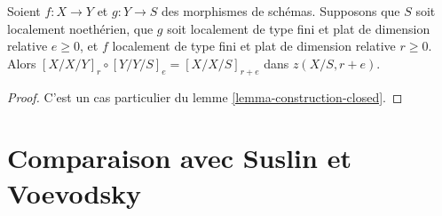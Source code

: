 \begin{lemma} 
\label{lemma-composition-fundamental-cycles} Soient
  $f : X \to Y$  et  $g : Y \to S$  des morphismes de schémas. Supposons
 que $S$ soit localement noethérien, que $g$ soit localement de type fini 
et plat de dimension relative  $e \ge 0$, et  $f$  localement de type fini
 et plat de dimension relative  $r \geq 0$. Alors  
$[X/X/Y]_r \circ [Y/Y/S]_e = [X/X/S]_{r + e}$  dans  $z(X/S, r + e)$. 
\end{lemma} 

\begin{proof} 
C'est un cas particulier du lemme \ref{lemma-construction-closed}. 
\end{proof} 






\section{Comparaison avec Suslin et Voevodsky} 
\label{section-compare} 

